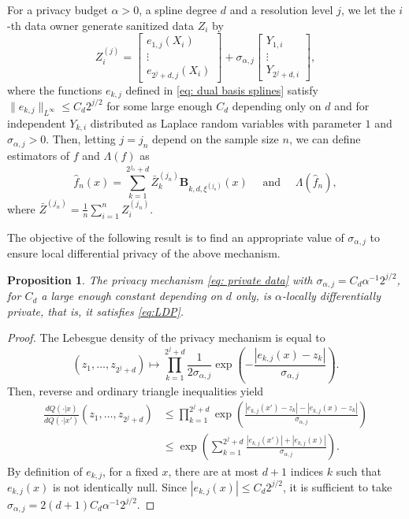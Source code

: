 \documentclass[preprint]{imsart}
\newtheorem{proposition}[theorem]{Proposition}
\numberwithin{equation}{section}
\begin{document}
For a privacy budget $\alpha>0$, a spline degree $d$ and a resolution level $j$, we let the $i$-th data owner  generate sanitized data $Z_i$ by
\begin{equation}\label{eq: private data}
    Z_i^{(j)} = \begin{bmatrix}
           e_{1,j}(X_i) \\
           \vdots \\
           e_{2^j+d,j}(X_i)
         \end{bmatrix} + \sigma_{\alpha,j} \begin{bmatrix}
             Y_{1,i}\\
             \vdots\\
             Y_{2^j+d,i}
         \end{bmatrix},
\end{equation}
where the functions $e_{k,j}$ defined in \eqref{eq: dual basis splines} satisfy $\|e_{k,j}\|_{L^\infty} \leq C_d2^{j/2}$ for some large enough $C_d$ depending only on $d$ and for independent $Y_{k,i}$ distributed as Laplace random variables with parameter $1$ and $\sigma_{\alpha,j}>0$. Then, letting $j=j_n$ depend on the sample size $n$, we can define estimators of $f$ and $\Lambda(f)$ as
\begin{equation}\label{eq: estimator}
\hat{f}_n(x)= \sum_{k=1}^{2^{j_n}+d} \bar{Z}^{(j_n)}_k\mathbf{B}_{k,d,\xi^{(j_n)}}(x) \quad\text{ and }\quad \Lambda(\hat{f}_n),\end{equation}
where $\bar{Z}^{(j_n)}=\frac1n \sum_{i=1}^n Z_i^{(j_n)}$. 

The objective of the following result is to find an appropriate value of $\sigma_{\alpha,j}$ to ensure local differential privacy of the above mechanism.
\begin{proposition}\label{th: privacy}
    The privacy mechanism \eqref{eq: private data} with $\sigma_{\alpha,j}=C_d\alpha^{-1}2^{j/2}$, for $C_d$ a large enough constant depending on $d$ only, is $\alpha$-locally differentially private, that is, it satisfies \eqref{eq:LDP}.
\end{proposition}
\begin{proof}
The Lebesgue density of the privacy mechanism is equal to
\begin{equation*}
(z_1,\dots, z_{2^{j}+d})\mapsto\prod_{k=1}^{2^{j}+d} \frac{1}{2\sigma_{\alpha,j}} \exp\left( -\frac{\left|e_{k,j}(x)-z_k\right|}{\sigma_{\alpha,j}}\right).
\end{equation*}
Then, reverse and ordinary triangle inequalities yield
\begin{align*}
\frac{dQ(\cdot | x)}{dQ(\cdot |x')}(z_1,\dots, z_{2^{j}+d})&\leq \prod_{k=1}^{2^j+d} \exp\left( \frac{\left|e_{k,j}(x')-z_k\right|-\left|e_{k,j}(x)-z_k\right|}{\sigma_{\alpha,j}}\right) \\
&\leq \exp\left( \sum_{k=1}^{2^j+d} \frac{\left|e_{k,j}(x')\right|+\left|e_{k,j}(x)\right|}{\sigma_{\alpha,j}}\right).
\end{align*}
By definition of $e_{k,j}$, for a fixed $x$, there are at most $d+1$ indices $k$ such that $e_{k,j}(x)$ is not identically null.  Since $|e_{k,j}(x)|\leq C_d 2^{j/2}$, it is sufficient to take $\sigma_{\alpha, j}=2(d+1)C_d\alpha^{-1}2^{j/2}$.
\end{proof}
\end{document}
